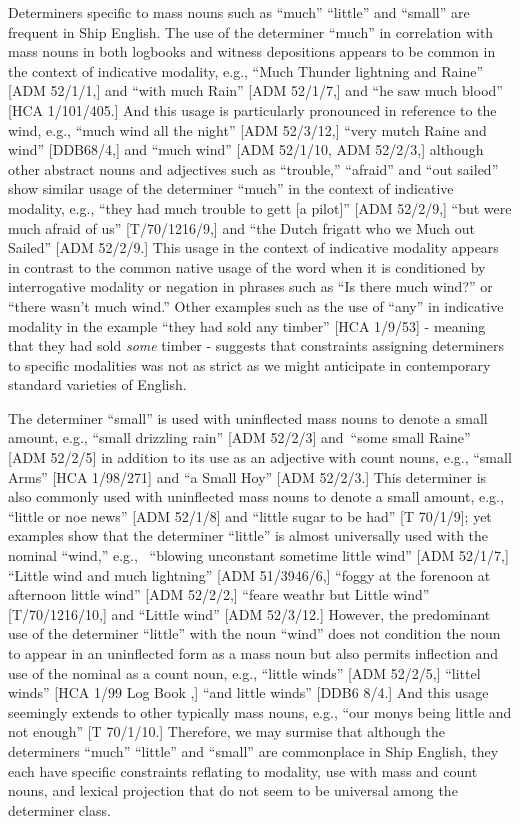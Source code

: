 Determiners specific to mass nouns such as “much” “little” and “small” are frequent in Ship English. The use of the determiner “much” in correlation with mass nouns in both logbooks and witness depositions appears to be common in the context of indicative modality, e.g., “Much Thunder lightning and Raine” [ADM 52/1/1,] and “with much Rain” [ADM 52/1/7,] and “he saw much blood” [HCA 1/101/405.] And this usage is particularly pronounced in reference to the wind, e.g., “much wind all the night” [ADM 52/3/12,] “very mutch Raine and wind” [DDB68/4,] and “much wind” [ADM 52/1/10, ADM 52/2/3,] although other abstract nouns and adjectives such as “trouble,” “afraid” and “out sailed” show similar usage of the determiner “much” in the context of indicative modality, e.g., “they had much trouble to gett [a pilot]” [ADM 52/2/9,] “but were much afraid of us” [T/70/1216/9,] and “the Dutch frigatt who we Much out Sailed” [ADM 52/2/9.] This usage in the context of indicative modality appears in contrast to the common native usage of the word when it is conditioned by interrogative modality or negation in phrases such as “Is there much wind?” or “there wasn’t much wind.” Other examples such as the use of “any” in indicative modality in the example “they had sold any timber” [HCA 1/9/53] - meaning that they had sold \textit{some} timber - suggests that constraints assigning determiners to specific modalities was not as strict as we might anticipate in contemporary standard varieties of English.  

The determiner “small” is used with uninflected mass nouns to denote a small amount, e.g., “small drizzling rain” [ADM 52/2/3] and~“some small Raine” [ADM 52/2/5] in addition to its use as an adjective with count nouns, e.g., “small Arms” [HCA 1/98/271] and “a Small Hoy” [ADM 52/2/3.] This determiner is also commonly used with uninflected mass nouns to denote a small amount, e.g., “little or noe news” [ADM 52/1/8] and “little sugar to be had” [T 70/1/9]; yet examples show that the determiner “little” is almost universally used with the nominal “wind,” e.g., ~“blowing unconstant sometime little wind” [ADM 52/1/7,] “Little wind and much lightning” [ADM 51/3946/6,] “foggy at the forenoon at afternoon little wind” [ADM 52/2/2,] “feare weathr but Little wind” [T/70/1216/10,] and “Little wind” [ADM 52/3/12.] However, the predominant use of the determiner “little” with the noun “wind” does not condition the noun to appear in an uninflected form as a mass noun but also permits inflection and use of the nominal as a count noun, e.g., “little winds” [ADM 52/2/5,] “littel winds” [HCA 1/99 Log Book \citealt{Pideaux1731},] “and little winds” [DDB6 8/4.] And this usage seemingly extends to other typically mass nouns, e.g., “our monys being little and not enough” [T 70/1/10.] Therefore, we may surmise that although the determiners “much” “little” and “small” are commonplace in Ship English, they each have specific constraints reflating to modality, use with mass and count nouns, and lexical projection that do not seem to be universal among the determiner class.  

